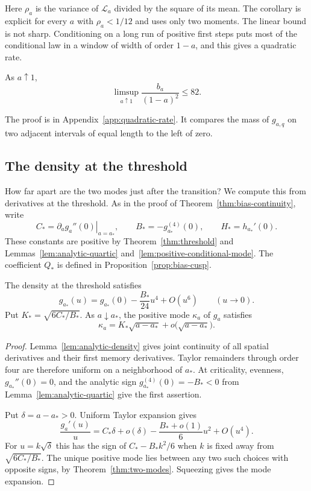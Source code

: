 Here $\rho_a$ is the variance of $\mathcal L_a$ divided by the square
of its mean. The corollary is explicit for every $a$ with
$\rho_a<1/12$ and uses only two moments. The linear bound is not sharp. Conditioning on a long run of positive
first steps puts most of the conditional law in a window of width of
order $1-a$, and this gives a quadratic rate.

\begin{proposition}\label{prop:quadratic-rate}
As $a\uparrow1$,
\[
 \limsup_{a\uparrow1}\frac{b_a}{(1-a)^2}\le82.
\]
\end{proposition}

The proof is in Appendix~\ref{app:quadratic-rate}. It compares the mass
of $g_{a,q}$ on two adjacent intervals of equal length to the left of
zero.

\subsection{The density at the threshold}\label{sec:critical-density}

How far apart are the two modes just after the transition?
We compute this from derivatives at the threshold. As in the proof
of Theorem~\ref{thm:bias-continuity}, write
\[
 C_* = \left.\partial_a g_a''(0)\right|_{a=a_*},\qquad
 B_*=-g_{a_*}^{(4)}(0),\qquad H_*=h_{a_*}'(0).
\]
These constants are positive by Theorem~\ref{thm:threshold} and
Lemmas~\ref{lem:analytic-quartic} and~\ref{lem:positive-conditional-mode}.
The coefficient $Q_*$ is defined in Proposition~\ref{prop:bias-cusp}.

\begin{proposition}\label{prop:critical-shape}
The density at the threshold satisfies
\[
 g_{a_*}(u)=g_{a_*}(0)-\frac{B_*}{24}u^4+O(u^6)
 \qquad(u\to0).
\]
Put $K_*=\sqrt{6C_*/B_*}$. As $a\downarrow a_*$, the positive mode
$\kappa_a$ of $g_a$ satisfies
\[
 \kappa_a=K_*\sqrt{a-a_*}+o\bigl(\sqrt{a-a_*}\bigr).
\]
\end{proposition}

\begin{proof}
Lemma~\ref{lem:analytic-density} gives joint continuity of all spatial
derivatives and their first memory derivatives. Taylor remainders
through order four are therefore uniform on a neighborhood of $a_*$.
At criticality, evenness, $g_{a_*}''(0)=0$, and the analytic sign
$g_{a_*}^{(4)}(0)=-B_*<0$ from Lemma~\ref{lem:analytic-quartic}
give the first assertion.

Put $\delta=a-a_*>0$. Uniform Taylor expansion gives
\[
 \frac{g_a'(u)}u=C_*\delta+o(\delta)
                  -\frac{B_*+o(1)}6u^2+O(u^4).
\]
For $u=k\sqrt\delta$ this has the sign of $C_*-B_*k^2/6$
when $k$ is fixed away from $\sqrt{6C_*/B_*}$. The unique positive
mode lies between any two such choices with opposite signs, by
Theorem~\ref{thm:two-modes}. Squeezing gives the mode expansion.
\end{proof}

